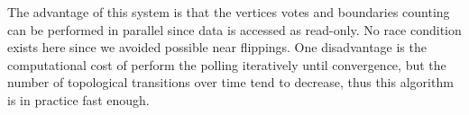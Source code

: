 The advantage of this system is that the vertices votes and boundaries counting can be performed in parallel since data is accessed as read-only. No race condition exists here since we avoided possible near flippings. One disadvantage is the computational cost of perform the polling iteratively until convergence, but the number of topological transitions over time tend to decrease, thus this algorithm is in practice fast enough.
